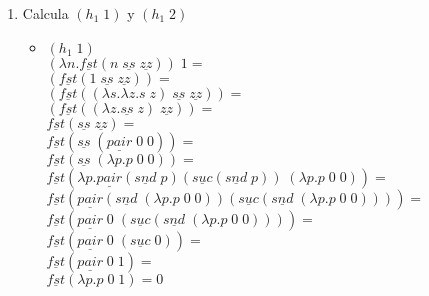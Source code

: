\documentclass[11pt, a4paper]{report}
\begin{document}
\begin{enumerate}[label=\alph*)]
\item Calcula $(h_{1})$ y $(h_{1})$
	\begin{itemize}
	\item $(h_{1})$ \\
    $(\lambda n. \underline{fst} (n\;\underline{ss}\;\underline{zz}))=$\\
    $(\underline{fst} (1\;\underline{ss}\;\underline{zz}))=$\\
    $(\underline{fst} ((\lambda s.\lambda z. s\;z)\;\underline{ss}\;\underline{zz}))=$\\
    $(\underline{fst} ((\lambda z. \underline{ss}\;z)\;\underline{zz}))=$\\
    $\underline{fst} (\underline{ss}\;\underline{zz})=$\\
    $\underline{fst} (\underline{ss}\;(\underline{pair}))=$\\
    $\underline{fst} (\underline{ss}\;(\lambda p.p))=$\\
    $\underline{fst} (\lambda p.\underline{pair} (\underline{snd}\;p) (\underline{suc} 
    (\underline{snd}\;p))\;(\lambda p.p))=$\\
    $\underline{fst} (\underline{pair} (\underline{snd}\;
    (\lambda p.p)) (\underline{suc}(\underline{snd}\;(\lambda p.p))))=$\\
    $\underline{fst} (\underline{pair}\; 
    (\underline{suc}(\underline{snd}\;(\lambda p.p))))=$\\
    $\underline{fst} (\underline{pair}\; 
    (\underline{suc}))=$\\
    $\underline{fst} (\underline{pair})=$\\
    $\underline{fst} (\lambda p. p)= 0$\\
    

\end{itemize}
\end{enumerate}
\end{document}
